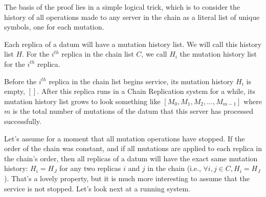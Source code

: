 \documentclass[preprint,10pt]{sigplanconf}
\begin{document}
The basis of the proof lies in a simple logical trick, which is to
consider the history of all operations made to any server in the chain
as a literal list of unique symbols, one for each mutation.

Each replica of a datum will have a mutation history list.  We will
call this history list $H$. For the $i^{th}$ replica in the chain list
$C$, we call $H_i$ the mutation history list for the $i^{th}$ replica.

Before the $i^{th}$ replica in the chain list begins service, its mutation
history $H_i$ is empty, $[]$.  After this replica runs in a Chain
Replication system for a while, its mutation history list grows to
look something like 
$[M_0, M_1, M_2, ..., M_{m-1}]$ where $m$ is the total number of
mutations of the datum that this server has processed successfully.

Let's assume for a moment that all mutation operations have stopped.
If the order of the chain was constant, and if all mutations are
applied to each replica in the chain's order, then all replicas of a
datum will have the exact same mutation history: $H_i = H_J$ for any
two replicas $i$ and $j$ in the chain
(i.e., $\forall i,j \in C, H_i = H_J$).  That's a lovely property,
but it is much more interesting to assume that the service is
not stopped.  Let's look next at a running system.
\end{document}
